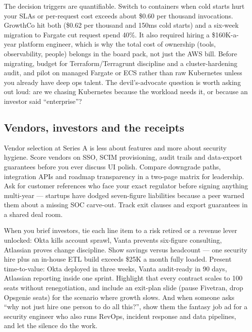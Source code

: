 The decision triggers are quantifiable. Switch to containers when cold starts hurt your SLAs or per-request cost exceeds about \$0.60 per thousand invocations. GrowthCo hit both (\$0.62 per thousand and 150ms cold starts) and a six-week migration to Fargate cut request spend 40\%. It also required hiring a \$160K-a-year platform engineer, which is why the total cost of ownership (tools, observability, people) belongs in the board pack, not just the AWS bill. Before migrating, budget for Terraform/Terragrunt discipline and a cluster-hardening audit, and pilot on managed Fargate or ECS rather than raw Kubernetes unless you already have deep ops talent. The devil's-advocate question is worth asking out loud: are we chasing Kubernetes because the workload needs it, or because an investor said ``enterprise''?



\subsection{Vendors, investors and the receipts}


Vendor selection at Series A is less about features and more about security hygiene. Score vendors on SSO, SCIM provisioning, audit trails and data-export guarantees before you ever discuss UI polish. Compare downgrade paths, integration APIs and roadmap transparency in a two-page matrix for leadership. Ask for customer references who face your exact regulator before signing anything multi-year — startups have dodged seven-figure liabilities because a peer warned them about a missing SOC carve-out. Track exit clauses and export guarantees in a shared deal room.


When you brief investors, tie each line item to a risk retired or a revenue lever unlocked: Okta kills account sprawl, Vanta prevents six-figure consulting, Atlassian proves change discipline. Show savings versus headcount — one security hire plus an in-house ETL build exceeds \$25K a month fully loaded. Present time-to-value: Okta deployed in three weeks, Vanta audit-ready in 90 days, Atlassian reporting inside one sprint. Highlight that every contract scales to 100 seats without renegotiation, and include an exit-plan slide (pause Fivetran, drop Opsgenie seats) for the scenario where growth slows. And when someone asks ``why not just hire one person to do all this?'', show them the fantasy job ad for a security engineer who also runs RevOps, incident response and data pipelines, and let the silence do the work.


